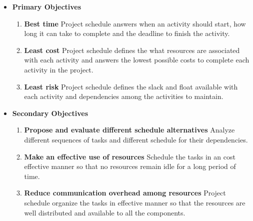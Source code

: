 \begin{spacing}{1}
\begin{itemize}
	\item \textbf{Primary Objectives}
	\begin{enumerate}
		\item \textbf{Best time} \newline Project schedule answers when an activity should start, how long it can take to complete and the deadline to finish the activity. 
		\item \textbf{Least cost} \newline Project schedule defines the what resources are associated with each activity and answers the lowest possible costs to complete each activity in the project.
		\item \textbf{Least risk} \newline Project schedule defines the slack and float available with each activity and dependencies among the activities to maintain.  
	\end{enumerate}
	\item \textbf{Secondary Objectives}
	\begin{enumerate}
		\item \textbf{Propose and evaluate different schedule alternatives} \newline Analyze different sequences of tasks and different schedule for their dependencies.
		\item \textbf{Make an effective use of resources} \newline Schedule the tasks in an cost effective manner so that no resources remain idle for a long period of time.
		\item \textbf{Reduce communication overhead among resources} \newline Project schedule organize the tasks in effective manner so that the resources are well distributed and available to all the components.
	\end{enumerate}
\end{itemize}


\end{spacing}
